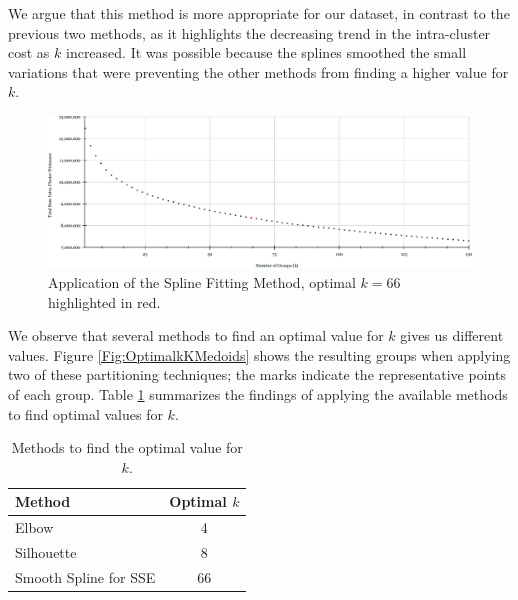 We argue that this method is more appropriate for our dataset, in contrast to the previous two methods, as it highlights the decreasing trend in the intra-cluster cost as $k$ increased. It was possible because the splines smoothed the small variations that were preventing the other methods from finding a higher value for $k$.

\begin{figure}[h]
	\centering
	\includegraphics[scale=0.5]{../Figures/SmoothSpline-kMedoids}
	\caption{Application of the Spline Fitting Method, optimal $k=66$ highlighted in red.}
	\label{Fig:SmoothSpline-kMedoids}
\end{figure}

We observe that several methods to find an optimal value for $k$ gives us different values. Figure \ref{Fig:OptimalkKMedoids} shows the resulting groups when applying two of these partitioning techniques; the marks indicate the representative points of each group. 
Table \ref{Table:ValidationIndex} summarizes the findings of applying the available methods to find optimal values for $k$.
\begin{table}[h]
	\centering
	\small
	\begin{tabular}{|l|c|}
		\hline
		Method & Optimal $k$ \\ \hline
		Elbow  & 4	\\
		Silhouette & 8	\\
		Smooth Spline for SSE & 66\\ \hline
	\end{tabular}
\caption{Methods to find the optimal value for $k$.}
\label{Table:ValidationIndex}
\end{table}
		
